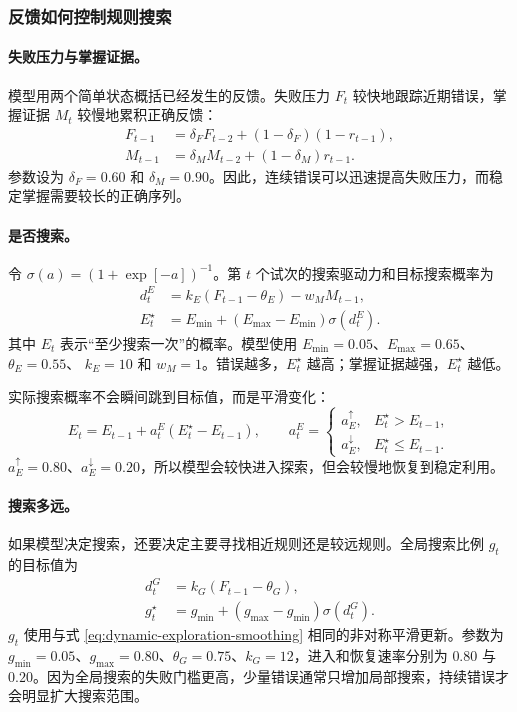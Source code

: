\subsubsection{反馈如何控制规则搜索}

\paragraph{失败压力与掌握证据。}
模型用两个简单状态概括已经发生的反馈。失败压力 $F_t$ 较快地跟踪近期错误，掌握证据 $M_t$ 较慢地累积正确反馈：
\begin{align}
F_{t-1}
&=\delta_FF_{t-2}+(1-\delta_F)(1-r_{t-1}),
\nonumber\\
M_{t-1}
&=\delta_MM_{t-2}+(1-\delta_M)r_{t-1}.
\label{eq:dynamic-failure-mastery}
\end{align}
参数设为 $\delta_F=0.60$ 和 $\delta_M=0.90$。因此，连续错误可以迅速提高失败压力，而稳定掌握需要较长的正确序列。

\paragraph{是否搜索。}
令 $\sigma(a)=(1+\exp[-a])^{-1}$。第 $t$ 个试次的搜索驱动力和目标搜索概率为
\begin{align}
d_t^E
&=k_E(F_{t-1}-\theta_E)-w_MM_{t-1},
\nonumber\\
E_t^{\star}
&=E_{\min}+(E_{\max}-E_{\min})\sigma(d_t^E).
\label{eq:dynamic-exploration-target}
\end{align}
其中 $E_t$ 表示“至少搜索一次”的概率。模型使用
$E_{\min}=0.05$、$E_{\max}=0.65$、$\theta_E=0.55$、
$k_E=10$ 和 $w_M=1$。错误越多，$E_t^{\star}$ 越高；掌握证据越强，$E_t^{\star}$ 越低。

实际搜索概率不会瞬间跳到目标值，而是平滑变化：
\begin{equation}
E_t=E_{t-1}+a_t^E(E_t^{\star}-E_{t-1}),
\qquad
a_t^E=
\begin{cases}
a_E^{\uparrow},&E_t^{\star}>E_{t-1},\\
a_E^{\downarrow},&E_t^{\star}\leq E_{t-1}.
\end{cases}
\label{eq:dynamic-exploration-smoothing}
\end{equation}
$a_E^{\uparrow}=0.80$、$a_E^{\downarrow}=0.20$，所以模型会较快进入探索，但会较慢地恢复到稳定利用。

\paragraph{搜索多远。}
如果模型决定搜索，还要决定主要寻找相近规则还是较远规则。全局搜索比例 $g_t$ 的目标值为
\begin{align}
d_t^G
&=k_G(F_{t-1}-\theta_G),
\nonumber\\
g_t^{\star}
&=g_{\min}+(g_{\max}-g_{\min})\sigma(d_t^G).
\label{eq:dynamic-global-target}
\end{align}
$g_t$ 使用与式 \ref{eq:dynamic-exploration-smoothing} 相同的非对称平滑更新。参数为
$g_{\min}=0.05$、$g_{\max}=0.80$、$\theta_G=0.75$、$k_G=12$，进入和恢复速率分别为 $0.80$ 与 $0.20$。因为全局搜索的失败门槛更高，少量错误通常只增加局部搜索，持续错误才会明显扩大搜索范围。

